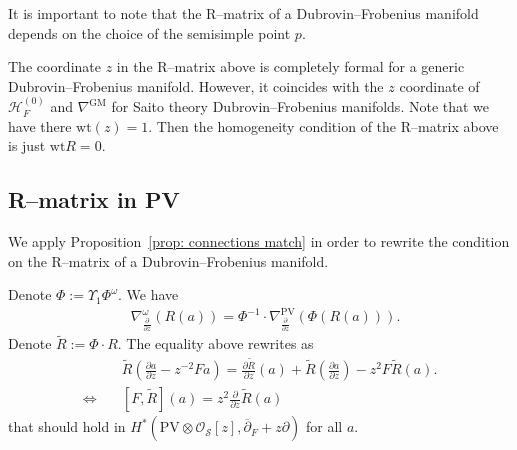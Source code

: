 \documentclass[12pt,a4paper]{amsart}
\newcommand{\Jac}{\mathrm{Jac}}
\newcommand{\wt}{\mathrm{wt}}
\def\H{{\mathcal H}}
\def\L{{\mathcal L}}
\def\O{{\mathcal O}}
\renewcommand{\S}{{\mathcal S}}
\newcommand{\p}{{\partial}}
\newcommand{\<}{\left<}
\renewcommand{\>}{\right>}
\newcommand{\PV}{{\mathrm{PV}}}
\newcommand{\GM}{{\mathrm{GM}}}
\newcommand{\End}{{\mathrm{End}}}
\numberwithin{equation}{section}
\begin{document}
It is important to note that the R--matrix of a Dubrovin--Frobenius manifold depends on the choice of the semisimple point $p$.

The coordinate $z$ in the R--matrix above is completely formal for a generic Dubrovin--Frobenius manifold. However, it coincides with the $z$ coordinate of $\H_F^{(0)}$ and $\nabla^\GM$ for Saito theory Dubrovin--Frobenius manifolds. Note that we have there $\wt(z) = 1$. Then the homogeneity condition of the R--matrix above is just $\wt R = 0$.

%

\subsection{R--matrix in PV}
We apply Proposition~\ref{prop: connections match} in order to rewrite the condition on the R--matrix of a Dubrovin--Frobenius manifold.

Denote $\Phi := \Upsilon_1 \Phi^\omega$. We have
\begin{align*}
    & \nabla_{\frac{\p}{\p z}}^\omega (R(a)) = \Phi^{-1} \cdot \nabla^\PV_{\frac{\p}{\p z}} \left( \Phi(R(a)) \right).
\end{align*}
Denote $\widetilde R := \Phi \cdot R$. The equality above rewrites as
\begin{align}\label{eq: widetilde R}
    & \widetilde R \left( \frac{\p a}{\p z} - z^{-2} Fa \right) = \frac{\p \widetilde R}{\p z}(a) + \widetilde R(\frac{\p a}{\p z}) - z^2 F \widetilde R (a).
    \\
    \Leftrightarrow \quad & [F, \widetilde R](a) = z^2 \frac{\p}{\p z} \widetilde R(a)
\end{align}
that should hold in $H^\ast(\PV\otimes\O_\S[z],\overline\p_F + z \p)$ for all $a$.
\end{document}
